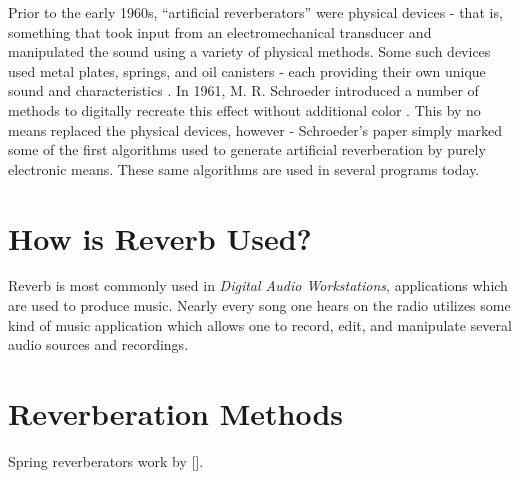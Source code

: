 Prior to the early 1960s, ``artificial reverberators'' were physical devices - that is, something that took input from an electromechanical transducer and manipulated the sound using a variety of physical methods. Some such devices used metal plates, springs, and oil canisters - each providing their own unique sound and characteristics \cite{FiftyYears}. In 1961, M. R. Schroeder introduced a number of methods to digitally recreate this effect without additional color \cite{schroeder1961natural}. This by no means replaced the physical devices, however - Schroeder's paper simply marked some of the first algorithms used to generate artificial reverberation by purely electronic means. These same algorithms are used in several programs today.

\section{How is Reverb Used?}
Reverb is most commonly used in \textit{Digital Audio Workstations}, applications which are used to produce music. Nearly every song one hears on the radio utilizes some kind of music application which allows one to record, edit, and manipulate several audio sources and recordings.


\section{Reverberation Methods}
Spring reverberators work by [].
